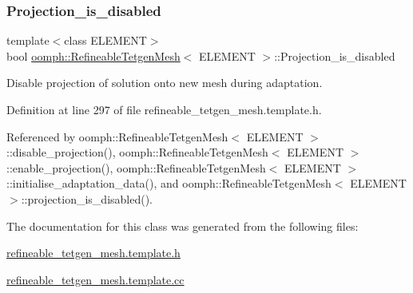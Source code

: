 \subsubsection{\texorpdfstring{Projection\+\_\+is\+\_\+disabled}{Projection\_is\_disabled}}
{\footnotesize\ttfamily template$<$class E\+L\+E\+M\+E\+NT$>$ \\
bool \hyperlink{classoomph_1_1RefineableTetgenMesh}{oomph\+::\+Refineable\+Tetgen\+Mesh}$<$ E\+L\+E\+M\+E\+NT $>$\+::Projection\+\_\+is\+\_\+disabled\hspace{0.3cm}{\ttfamily [protected]}}



Disable projection of solution onto new mesh during adaptation. 



Definition at line 297 of file refineable\+\_\+tetgen\+\_\+mesh.\+template.\+h.



Referenced by oomph\+::\+Refineable\+Tetgen\+Mesh$<$ E\+L\+E\+M\+E\+N\+T $>$\+::disable\+\_\+projection(), oomph\+::\+Refineable\+Tetgen\+Mesh$<$ E\+L\+E\+M\+E\+N\+T $>$\+::enable\+\_\+projection(), oomph\+::\+Refineable\+Tetgen\+Mesh$<$ E\+L\+E\+M\+E\+N\+T $>$\+::initialise\+\_\+adaptation\+\_\+data(), and oomph\+::\+Refineable\+Tetgen\+Mesh$<$ E\+L\+E\+M\+E\+N\+T $>$\+::projection\+\_\+is\+\_\+disabled().



The documentation for this class was generated from the following files\+:\begin{DoxyCompactItemize}
\item 
\hyperlink{refineable__tetgen__mesh_8template_8h}{refineable\+\_\+tetgen\+\_\+mesh.\+template.\+h}\item 
\hyperlink{refineable__tetgen__mesh_8template_8cc}{refineable\+\_\+tetgen\+\_\+mesh.\+template.\+cc}\end{DoxyCompactItemize}
